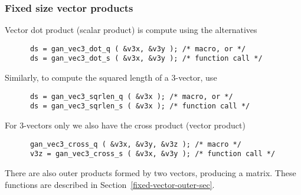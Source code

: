 \subsubsection{Fixed size vector products}
Vector dot product (scalar product) is compute using the alternatives
\begin{verbatim}
      ds = gan_vec3_dot_q ( &v3x, &v3y ); /* macro, or */
      ds = gan_vec3_dot_s ( &v3x, &v3y ); /* function call */
\end{verbatim}
Similarly, to compute the squared length of a 3-vector, use
\begin{verbatim}
      ds = gan_vec3_sqrlen_q ( &v3x ); /* macro, or */
      ds = gan_vec3_sqrlen_s ( &v3x ); /* function call */
\end{verbatim}

For 3-vectors only we also have the cross product (vector product)
\begin{verbatim}
      gan_vec3_cross_q ( &v3x, &v3y, &v3z ); /* macro */
      v3z = gan_vec3_cross_s ( &v3x, &v3y ); /* function call */
\end{verbatim}

There are also outer products formed by two vectors, producing a matrix.
These functions are described in Section~\ref{fixed-vector-outer-sec}.

